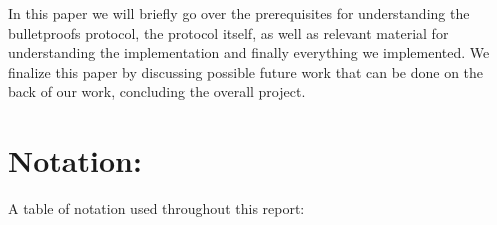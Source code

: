 \documentclass{article}
\begin{document}
In this paper we will briefly go over the prerequisites for understanding the bulletproofs protocol, the protocol itself, as well as relevant material for understanding the implementation and finally everything we implemented. We finalize this paper by discussing possible future work that can be done on the back of our work, concluding the overall project.










\section{Notation:} \label{notation}

A table of notation used throughout this report:
\end{document}
